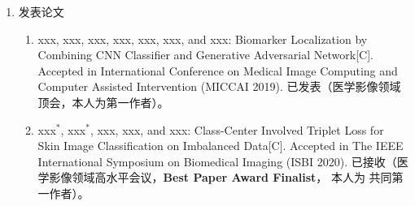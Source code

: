 \begin{enumerate}
	\item {\heiti 发表论文}
	\begin{enumerate}
		\item xxx, xxx, xxx, xxx, xxx, xxx, and xxx: Biomarker Localization by Combining CNN Classifier and Generative Adversarial Network[C]. Accepted in International Conference on Medical Image Computing and Computer Assisted Intervention (MICCAI 2019). {\heiti 已发表（医学影像领域顶会，本人为第一作者）}。
		\item xxx$^*$, xxx$^*$, xxx, xxx, and xxx: Class-Center Involved Triplet Loss  for Skin Image Classification on Imbalanced Data[C]. Accepted in The IEEE International Symposium on Biomedical Imaging (ISBI 2020). {\heiti 已接收（医学影像领域高水平会议}，\textbf{Best Paper Award Finalist}， {\heiti 本人为} {\heiti 共同第一作者）。}
	\end{enumerate}
	
\end{enumerate}
